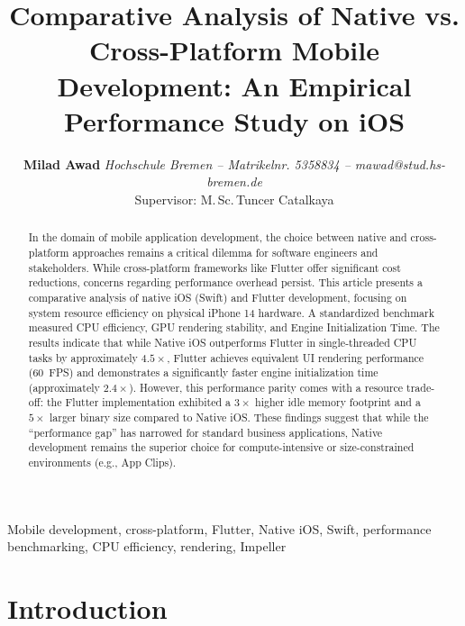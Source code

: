 \documentclass[journal]{IEEEtran}
\begin{document}
\title{Comparative Analysis of Native vs. Cross-Platform Mobile Development: An Empirical Performance Study on iOS}

\author{\textbf{Milad Awad} \textit{Hochschule Bremen -- Matrikelnr. 5358834 -- mawad@stud.hs-bremen.de}%
	\\Supervisor: M.\,Sc.\,Tuncer Catalkaya%
	\vspace{-0.5cm}
}

\maketitle

\begin{abstract}
	In the domain of mobile application development, the choice between native and cross-platform approaches
	remains a critical dilemma for software engineers and stakeholders. While cross-platform frameworks like
	Flutter offer significant cost reductions, concerns regarding performance overhead persist. This article
	presents a comparative analysis of native iOS (Swift) and Flutter development, focusing on system resource
	efficiency on physical iPhone 14 hardware. A standardized benchmark measured CPU efficiency, GPU rendering
	stability, and Engine Initialization Time. The results indicate that while Native iOS outperforms Flutter
	in single-threaded CPU tasks by approximately $4.5\times$, Flutter achieves equivalent UI rendering performance
	(60~FPS) and demonstrates a significantly faster engine initialization time (approximately $2.4\times$). However, this
	performance parity comes with a resource trade-off: the Flutter implementation exhibited a $3\times$ higher idle
	memory footprint and a $5\times$ larger binary size compared to Native iOS. These findings suggest that while the
	``performance gap'' has narrowed for standard business applications, Native development remains the superior
	choice for compute-intensive or size-constrained environments (e.g., App Clips).
\end{abstract}

\begin{IEEEkeywords}
	Mobile development, cross-platform, Flutter, Native iOS, Swift, performance benchmarking, CPU efficiency,
	rendering, Impeller
\end{IEEEkeywords}

\section{Introduction}
\end{document}
